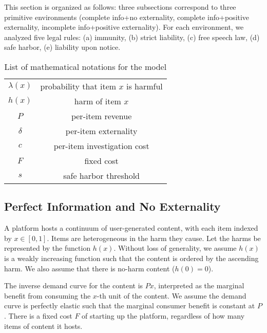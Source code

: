 This section is organized as follows: three subsections correspond to three primitive environments (complete info+no externality, complete info+positive externality, incomplete info+positive externality). For each environment, we analyzed five legal rules: (a) immunity, (b) strict liability, (c) free speech law, (d) safe harbor, (e) liability upon notice.

\begin{table}[]
    \centering
\begin{tabular}{c|c}
    $\lambda(x)$ & probability that item $x$ is harmful \\
    $h(x)$ & harm of item $x$ \\
    $P$ & per-item revenue \\ %
    $\delta$ & per-item externality \\
    $c$ & per-item investigation cost \\
    $F$ & fixed cost \\
    $s$ & safe harbor threshold
\end{tabular}
\caption{List of mathematical notations for the model}
\end{table}


\subsection{Perfect Information and No Externality}

A platform hosts a continuum of user-generated content, with each item indexed by $x\in[0,1]$. 
Items are heterogeneous in the harm they cause. Let the harms be represented by the function $h(x)$. Without loss of generality, we assume $h(x)$ is a weakly increasing function such that the content is ordered by the ascending harm. We also assume that there is no-harm content ($h(0)=0$).

The inverse demand curve for the content is $Px$, interpreted as the marginal benefit from consuming the $x$-th unit of the content. We assume the demand curve is perfectly elastic such that the marginal consumer benefit is constant at $P$.
There is a fixed cost $F$ of starting up the platform, regardless of how many items of content it hosts.

